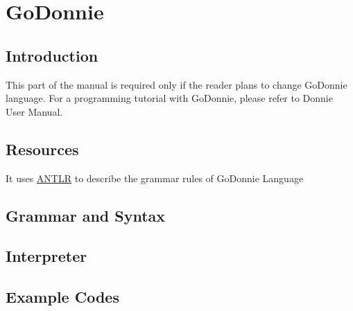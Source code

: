 \chapter{GoDonnie}

\section{Introduction}
\label{sec:godonnie_intro}

This part of the manual is required only if the reader plans to change GoDonnie language. 
For a programming tutorial with GoDonnie, please refer to Donnie User Manual.

\section{Resources}
\label{sec:godonnie_rec}

It uses \href{www.antlr.org/}{ANTLR} to describe the grammar rules of GoDonnie Language


\section{Grammar and Syntax}
\label{sec:godonnie_grammar}

\section{Interpreter}
\label{sec:godonnie_interp}

\section{Example Codes}
\label{sec:godonnie_codes}


